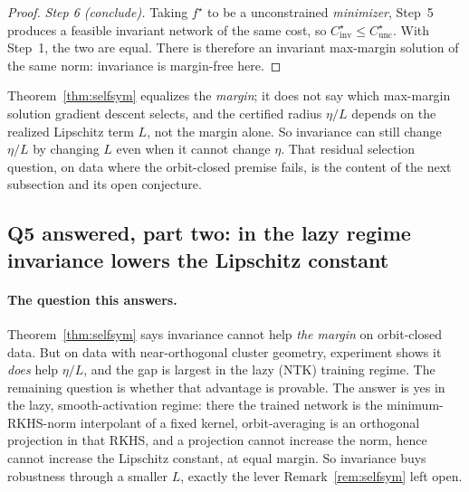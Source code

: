 \begin{proof}
\emph{Step 6 (conclude).}
Taking $f^\star$ to be a unconstrained \emph{minimizer}, Step~5 produces a feasible invariant network
of the same cost, so $C^\star_{\mathrm{inv}} \le C^\star_{\mathrm{unc}}$. With Step~1, the two are
equal. There is therefore an invariant max-margin solution of the same norm: invariance is
margin-free here.
\end{proof}

\begin{remark}
\label{rem:selfsym}
Theorem~\ref{thm:selfsym} equalizes the \emph{margin}; it does not say which max-margin solution
gradient descent selects, and the certified radius $\eta/L$ depends on the realized Lipschitz term
$L$, not the margin alone. So invariance can still change $\eta/L$ by changing $L$ even when it cannot
change $\eta$. That residual selection question, on data where the orbit-closed premise fails, is the
content of the next subsection and its open conjecture.
\end{remark}


\subsection{Q5 answered, part two: in the lazy regime invariance lowers the Lipschitz constant}
\label{sub:lazy}

\paragraph{The question this answers.}
Theorem~\ref{thm:selfsym} says invariance cannot help \emph{the margin} on orbit-closed data. But on
data with near-orthogonal cluster geometry, experiment shows it \emph{does} help $\eta/L$, and the
gap is largest in the lazy (NTK) training regime. The remaining question is whether that advantage is
provable. The answer is yes in the lazy, smooth-activation regime: there the trained network is the
minimum-RKHS-norm interpolant of a fixed kernel, orbit-averaging is an orthogonal projection in that
RKHS, and a projection cannot increase the norm, hence cannot increase the Lipschitz constant, at
equal margin. So invariance buys robustness through a smaller $L$, exactly the lever
Remark~\ref{rem:selfsym} left open.

